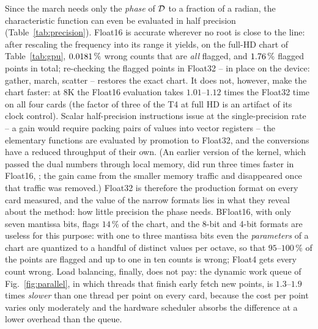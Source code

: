 Since the march needs only the
\emph{phase} of $\mathcal{D}$ to a fraction of a radian, the characteristic function
can even be evaluated in half precision (Table~\ref{tab:precision}). Float16
is accurate wherever no root is close to the line: after rescaling the
frequency into its range it yields, on the full-HD chart of
Table~\ref{tab:gpu}, $0.0181\,\%$ wrong counts that are \emph{all}
flagged, and $1.76\,\%$ flagged points in total; re-checking the
flagged points in Float32 -- in place on the device: gather, march, scatter --
restores the exact chart. It does not, however, make the chart faster: at 8K
the Float16 evaluation takes $1.01$--$1.12$ times the Float32 time on all four
cards (the factor of three of the T4 at full HD is an artifact of its clock
control). Scalar half-precision instructions issue at the single-precision
rate -- a gain would require packing pairs of values into vector registers --
the elementary functions are evaluated by promotion to Float32, and the
conversions have a reduced throughput of their own. (An earlier version of the
kernel, which passed the dual numbers through local memory, did run three
times faster in Float16, ; the gain came
from the smaller memory traffic and disappeared once that traffic was
removed.) Float32 is therefore the production format on every card measured,
and the value of the narrow formats lies in what they reveal about the method:
how little precision the phase needs. BFloat16, with only seven mantissa bits,
flags $14\,\%$ of the chart, and the 8-bit and 4-bit formats are useless for
this purpose: with one to three mantissa bits even the \emph{parameters} of a
chart are quantized to a handful of distinct values per octave, so that
$95$--$100\,\%$ of the points are flagged and up to one in ten counts is
wrong; Float4 gets every count wrong. Load balancing, finally, does not pay:
the dynamic work queue of Fig.~\ref{fig:parallel}, in which threads that finish
early fetch new points, is $1.3$--$1.9$ times \emph{slower} than one thread per
point on every card, because the cost per point varies only moderately and the
hardware scheduler absorbs the difference at a lower overhead than the queue.
